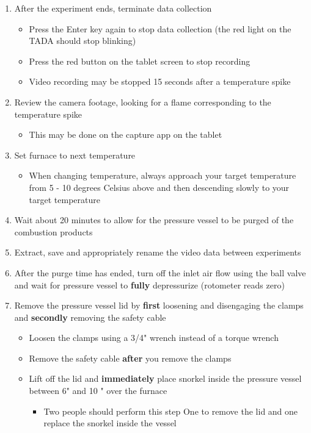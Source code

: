 \documentclass[letterpaper,11pt]{article}
\begin{document}
\begin{enumerate}
    \item After the experiment ends, terminate data collection
        \begin{itemize}
        \item Press the Enter key  again to stop data 
            collection (the red light on the TADA should stop blinking)
        \item Press the red button on the tablet screen to stop recording
        \item Video recording may be stopped 15 seconds after a temperature 
            spike
        \end{itemize}

    \item Review the camera footage, looking for a flame corresponding to the 
        temperature spike
        \begin{itemize}
        \item This may be done on the capture app on the tablet
        \end{itemize}
        
    \item Set furnace to next temperature
        \begin{itemize}
            \item When changing temperature, always approach your target
                temperature from 5 - 10 degrees Celsius above and then 
                descending slowly to your target temperature
        \end{itemize}
    \item Wait about 20 minutes to allow for the pressure 
        vessel to be purged of the combustion products
    \item Extract, save and appropriately rename the video data between 
            experiments
    \item After the purge time has ended, turn off the inlet air flow using the 
        ball valve and wait for pressure vessel to \textbf{fully} depressurize 
        (rotometer reads zero)
    \item Remove the pressure vessel lid by \textbf{first} loosening and 
        disengaging the clamps and \textbf{secondly} removing the safety cable
        \begin{itemize}
        \item Loosen the clamps using a 3/4" wrench instead of a 
            torque wrench
        \item Remove the safety cable \textbf{after} you remove the clamps
        \item Lift off the lid and \textbf{immediately} place snorkel inside the 
        pressure vessel between 6" and 10 " over the furnace
            \begin{itemize}
            \item Two people should perform this step One to remove the lid and one
                replace the snorkel inside the vessel
            \end{itemize}
        \end{itemize}
        

\end{enumerate}
\end{document}
